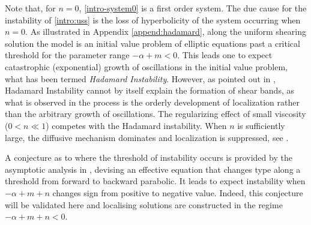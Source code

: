 \documentclass[a4paper,11pt]{article}
\def\blue{\color{blue}}
\theoremstyle{remark}
\begin{document}
{\blue
Note that, for $n=0$, \eqref{intro-system0} is a first order system. The due cause for the instability of \eqref{intro:uss} is the loss of hyperbolicity of the system occurring when $n=0$.}  As illustrated in Appendix \ref{append:hadamard}, along the uniform shearing solution the model is an initial value problem of elliptic equations past a critical threshold for the parameter range $-\alpha+m<0$. This leads {\blue one} to expect {\blue catastrophic (exponential)} growth of oscillations in the initial value problem, what has been termed {\it Hadamard Instability}. However, as pointed out in \cite{KOT14},  Hadamard Instability cannot by itself explain the formation of shear bands, 
as what is observed in the process is the orderly development of localization \cite{zener_effect_1944} rather than the arbitrary growth of oscillations. {\blue The regularizing effect of small viscosity ($0 < n \ll 1$) competes with the Hadamard instability.}
When $n$ is sufficiently large, the diffusive mechanism {\blue dominates} and localization is suppressed, see \cite{DH_1983, Tz_1986, tzavaras_nonlinear_1992}. 

A conjecture as to where the threshold of instability occurs is provided by the asymptotic analysis in  \cite{KT09}, devising
an effective equation that changes type along a threshold from forward to backward parabolic.
 It leads to expect instability when $-\alpha+m+n$ changes sign from positive to negative value. Indeed,
this conjecture will be validated here and localising solutions are constructed in the regime $-\alpha+m+n<0$.
\end{document}
